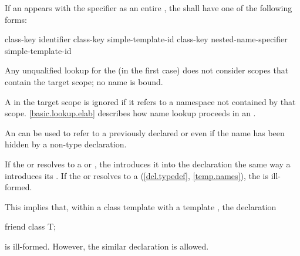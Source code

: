 \pnum
If an  appears with
the  specifier as an entire ,
the  shall have one of the following forms:
\begin{ncsimplebnf}
 class-key  identifier \terminal{;}\br
{} class-key simple-template-id \terminal{;}\br
{} class-key nested-name-specifier  simple-template-id \terminal{;}
\end{ncsimplebnf}
Any unqualified lookup for the  (in the first case)
does not consider scopes that contain the target scope; no name is bound.
\begin{note}
A  in the target scope is ignored
if it refers to a namespace not contained by that scope.
\ref{basic.lookup.elab} describes how name lookup proceeds
in an .
\end{note}

\pnum
\begin{note}
An  can be used to refer to
a previously declared  or 
even if the name has been hidden by a non-type declaration.
\end{note}
If the  or 
resolves to a  or
, the 
introduces it into the declaration the same way a
 introduces
its .
If the  or  resolves to a
 (\ref{dcl.typedef}, \ref{temp.names}),
the  is ill-formed.
\begin{note}
This implies that, within a class template with a template
 , the declaration
\begin{codeblock}
friend class T;
\end{codeblock}
is ill-formed. However, the similar declaration  is allowed.
\end{note}

